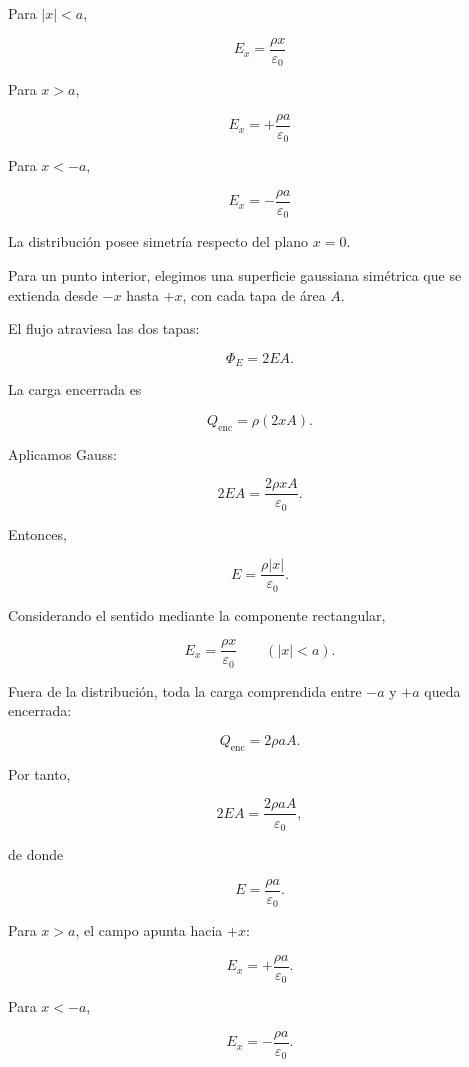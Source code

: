 \begin{respuesta}

Para \(|x|<a\),

\[
\boxed{
E_x=\frac{\rho x}{\varepsilon_0}
}
\]

Para \(x>a\),

\[
\boxed{
E_x=+\frac{\rho a}{\varepsilon_0}
}
\]

Para \(x<-a\),

\[
\boxed{
E_x=-\frac{\rho a}{\varepsilon_0}
}
\]

\end{respuesta}

\begin{explicacion}

La distribución posee simetría respecto del plano \(x=0\).

Para un punto interior, elegimos una superficie gaussiana simétrica que se extienda
desde \(-x\) hasta \(+x\), con cada tapa de área \(A\).

El flujo atraviesa las dos tapas:

\[
\Phi_E=2EA.
\]

La carga encerrada es

\[
Q_{\text{enc}}
=
\rho(2xA).
\]

Aplicamos Gauss:

\[
2EA
=
\frac{2\rho xA}{\varepsilon_0}.
\]

Entonces,

\[
E=\frac{\rho|x|}{\varepsilon_0}.
\]

Considerando el sentido mediante la componente rectangular,

\[
\boxed{
E_x=\frac{\rho x}{\varepsilon_0}
\qquad(|x|<a)
}.
\]

Fuera de la distribución, toda la carga comprendida entre \(-a\) y \(+a\) queda
encerrada:

\[
Q_{\text{enc}}=2\rho aA.
\]

Por tanto,

\[
2EA
=
\frac{2\rho aA}{\varepsilon_0},
\]

de donde

\[
E=\frac{\rho a}{\varepsilon_0}.
\]

Para \(x>a\), el campo apunta hacia \(+x\):

\[
\boxed{
E_x=+\frac{\rho a}{\varepsilon_0}
}.
\]

Para \(x<-a\),

\[
\boxed{
E_x=-\frac{\rho a}{\varepsilon_0}
}.
\]

\end{explicacion}


